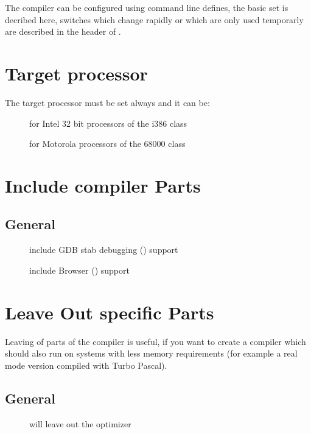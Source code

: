 \documentclass{report}
\begin{document}
The compiler can be configured using command line defines, the
basic set is decribed here, switches which change rapidly or
which are only used temporarly are described in the header
of .

\section{Target processor}

The target processor must be set always and it can be:

\begin{description}
\item [] for Intel 32 bit processors of the i386 class
\item [] for Motorola processors of the 68000 class
\end{description}

\section{Include compiler Parts}

\subsection{General}
\begin{description}
 \item[] include GDB stab debugging () support
 \item[] include Browser () support
\end{description}

\section{Leave Out specific Parts}

Leaving of parts of the compiler is useful, if you want to create
a compiler which should also run on systems with less memory
requirements (for example a real mode version compiled with Turbo Pascal).

\subsection{General}
\begin{description}
 \item[] will leave out the optimizer
\end{description}
\end{document}
